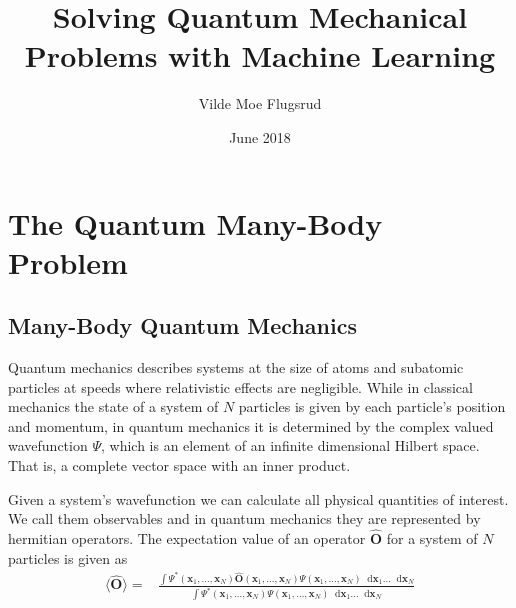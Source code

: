 \documentclass[twoside,english]{uiofysmaster}
\author{Vilde Moe Flugsrud}
\title{Solving Quantum Mechanical Problems with Machine Learning}
\date{June 2018}
\newcommand*\dif{\mathop{}\!\mathrm{d}}
\begin{document}



\tableofcontents




\chapter{The Quantum Many-Body Problem}

\section{Many-Body Quantum Mechanics}
Quantum mechanics describes systems at the size of atoms and subatomic particles at speeds where relativistic effects are negligible. While in classical mechanics the state of a system of $N$ particles is given by each particle's position and momentum, in quantum mechanics it is determined by the complex valued wavefunction $\Psi$, which is an element of an infinite dimensional Hilbert space. That is, a complete vector space with an inner product.\cite{Kvaal2017}

Given a system's wavefunction we can calculate all physical quantities of interest\cite{Kvaal2017}. We call them observables and in quantum mechanics they are represented by hermitian operators.
The expectation value of an operator $\hat{\bm{O}}$ for a system of $N$ particles is given as \cite{HjortJensen2015}
\begin{align}
	\langle \hat{\bm{O}} \rangle =& \frac{\int \Psi^{\ast}(\bm{x}_1,...,\bm{x}_N) \hat{\bm{O}}(\bm{x}_1,...,\bm{x}_N)
	\Psi (\bm{x}_1,...,\bm{x}_N)
	\dif \bm{x}_1 ... \dif \bm{x}_N  }
	{\int \Psi^{\ast}(\bm{x}_1,...,\bm{x}_N)
	\Psi (\bm{x}_1,...,\bm{x}_N)
	\dif \bm{x}_1 ... \dif \bm{x}_N}
\end{align}
\end{document}
